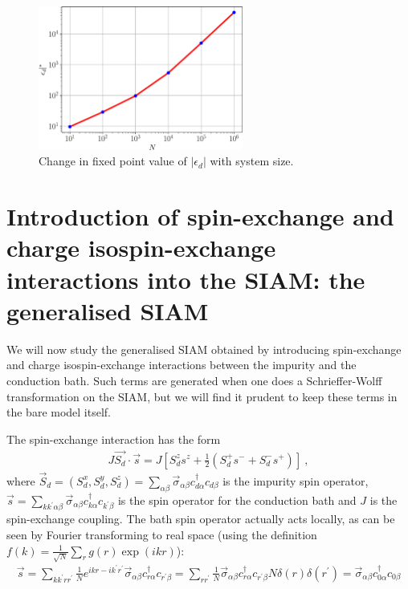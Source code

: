 \begin{figure}[htpb]
	\centering
	\includegraphics[width=0.6\textwidth]{../figures/ed_vs_size.pdf}
	\caption{Change in fixed point value of \(|\epsilon_d|\) with system size.}
	\label{edvsD}
\end{figure}
\section{Introduction of spin-exchange and charge isospin-exchange interactions into the SIAM: the generalised SIAM}
We will now study the generalised SIAM obtained by introducing spin-exchange and charge isospin-exchange interactions between the impurity and the conduction bath. Such terms are generated when one does a Schrieffer-Wolff transformation on the SIAM, but we will find it prudent to keep these terms in the bare model itself.

The spin-exchange interaction has the form
\begin{equation}\begin{aligned}
	J \vec{S_d}\cdot\vec{s} = J \left[S_d^z s^z + \frac{1}{2}\left( S_d^+ s^- + S_d^- s^+ \right) \right] ~,
\end{aligned}\end{equation}
where \(\vec S_d = \left(S_d^x, S_d^y, S_d^z\right) = \sum_{\alpha\beta}\vec \sigma_{\alpha\beta}c^\dagger_{d\alpha}c_{d\beta}\) is the impurity spin operator, \(\vec s = \sum_{kk^\prime\alpha\beta}\vec \sigma_{\alpha\beta}c^\dagger_{k\alpha}c_{k^\prime\beta}\) is the spin operator for the conduction bath and \(J\) is the spin-exchange coupling. The bath spin operator actually acts locally, as can be seen by Fourier transforming to real space (using the definition \(f(k) = \frac{1}{\sqrt N}\sum_r g(r)\exp(ikr)\)):
\begin{equation}\begin{aligned}
	\vec s = \sum_{k k^\prime r r^\prime} \frac{1}{N} e^{ikr - ik^\prime r^\prime} \vec \sigma_{\alpha\beta} c^\dagger_{r\alpha} c_{r^\prime\beta} = \sum_{rr^\prime}\frac{1}{N}\vec \sigma_{\alpha\beta} c^\dagger_{r\alpha} c_{r^\prime\beta} N \delta(r)\delta(r^\prime) = \vec \sigma_{\alpha\beta} c^\dagger_{0\alpha} c_{0\beta}
\end{aligned}\end{equation}

